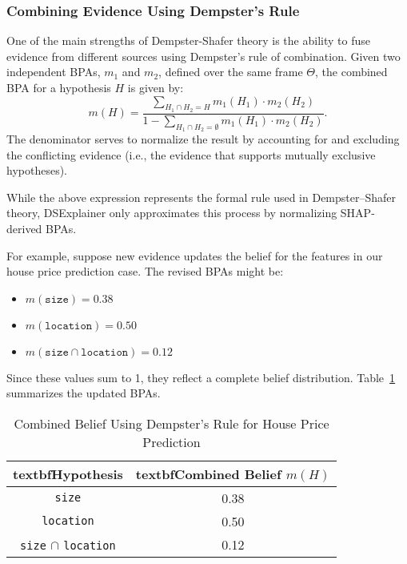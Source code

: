 \documentclass[acmlarge]{acmart}
\begin{document}
\subsubsection{Combining Evidence Using Dempster's Rule}

One of the main strengths of Dempster-Shafer theory is the ability to fuse evidence from different sources using Dempster's rule of combination. Given two independent BPAs, \( m_1 \) and \( m_2 \), defined over the same frame \(\Theta\), the combined BPA for a hypothesis \( H \) is given by:
\[
m(H) = \frac{\sum_{H_1 \cap H_2 = H} m_1(H_1) \cdot m_2(H_2)}{1 - \sum_{H_1 \cap H_2 = \emptyset} m_1(H_1) \cdot m_2(H_2)}.
\]
The denominator serves to normalize the result by accounting for and excluding the conflicting evidence (i.e., the evidence that supports mutually exclusive hypotheses).

While the above expression represents the formal rule used in Dempster--Shafer theory, DSExplainer only approximates this process by normalizing SHAP-derived BPAs.

For example, suppose new evidence updates the belief for the features in our house price prediction case. The revised BPAs might be:
\begin{itemize}
    \item \( m(\texttt{size}) = 0.38 \)
    \item \( m(\texttt{location}) = 0.50 \)
    \item \( m(\texttt{size} \cap \texttt{location}) = 0.12 \)
\end{itemize}
Since these values sum to 1, they reflect a complete belief distribution. Table~\ref{tab:combined_belief} summarizes the updated BPAs.

\begin{table}[H]
    \caption{Combined Belief Using Dempster's Rule for House Price Prediction}
    \label{tab:combined_belief}
    \centering
    \begin{tabular}{|c|c|}
        \hline
        textbf{Hypothesis} & textbf{Combined Belief \( m(H) \)} \\
        \hline
        \texttt{size} & 0.38 \\
        \hline
        \texttt{location} & 0.50 \\
        \hline
        \texttt{size} \(\cap\) \texttt{location} & 0.12 \\
        \hline
    \end{tabular}
\end{table}
\end{document}

